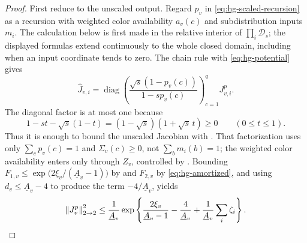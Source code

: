 \begin{proof}
First reduce to the unscaled output.  Regard \(p_v\) in
\eqref{eq:hg-scaled-recursion} as a recursion with weighted color
availability \(a_v(c)\) and subdistribution inputs \(m_i\).
The calculation below is first made in the relative interior of
$\prod_i\mathcal D_s$; the displayed formulas extend continuously to
the whole closed domain, including when an input coordinate tends to zero.
The chain rule with \eqref{eq:hg-potential} gives
\begin{equation}
 \widehat J_{v,i}
 =\operatorname{diag}\left(
   \frac{\sqrt s(1-p_v(c))}{1-sp_v(c)}
  \right)_{c=1}^q J^p_{v,i}.
 \label{eq:hg-scaled-row-factor}
\end{equation}
The diagonal factor is at most one because
\[
  1-st-\sqrt s(1-t)
   =(1-\sqrt s)(1+\sqrt s\,t)\ge0
  \qquad(0\le t\le1).
\]
Thus it is enough to bound the unscaled Jacobian with
.  That factorization uses only
\(\sum_cp_v(c)=1\) and \(\Sigma_v(c)\ge0\), not \(\sum_bm_i(b)=1\); the weighted
color availability enters only through \(Z_v\), controlled by
.
Bounding \(F_{1,v}\le
\exp\bigl(2\xi_v/(\underline A_v-1)\bigr)\) by
 and \(F_{2,v}\) by
\eqref{eq:hg-amortized}, and using
\(d_v\le\underline A_v-4\) to produce the term
\(-4/\underline A_v\), yields
\begin{equation}
 \left\|J^p_v\right\|_{2\to2}^2
 \le\frac1{\underline A_v}
 \exp\left\{
   \frac{2\xi_v}{\underline A_v-1}-\frac4{\underline A_v}
   +\frac1{\underline A_v}\sum_i\zeta_i
 \right\}.
 \label{eq:hg-euclidean-jacobian}
\end{equation}


\end{proof}
